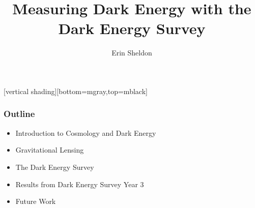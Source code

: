 \documentclass{beamer}
\title{Measuring Dark Energy with the\\Dark Energy Survey}
\author{Erin Sheldon}
\institute{Brookhaven National Laboratory}
\begin{document}
\frame{\titlepage}

\frame
{
}


[vertical shading][bottom=mgray,top=mblack]

\frame
{
    \frametitle{Outline}

 
    \begin{itemize}

        \item Introduction to Cosmology and Dark Energy

        \item Gravitational Lensing

        \item The Dark Energy Survey

        \item Results from Dark Energy Survey Year 3

        \item Future Work

    \end{itemize}

}
\end{document}
